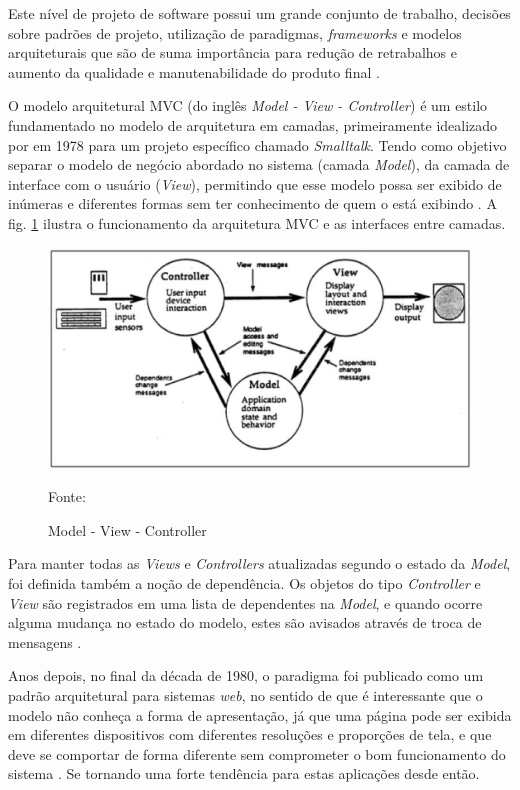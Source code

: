 Este nível de projeto de software possui um grande conjunto de trabalho, decisões sobre padrões de projeto, utilização de paradigmas, \textit{frameworks} e modelos arquiteturais que são de suma importância para redução de retrabalhos e aumento da qualidade e manutenabilidade do produto final \cite{krasner1988}.

O modelo arquitetural MVC (do inglês \textit{Model - View - Controller}) é um estilo fundamentado no modelo de arquitetura em camadas, primeiramente idealizado por \cite{reenskaug1979} em 1978 para um projeto específico chamado \textit{Smalltalk}. Tendo como objetivo separar o modelo de negócio abordado no sistema (camada \textit{Model}), da camada de interface com o usuário (\textit{View}), permitindo que esse modelo possa ser exibido de inúmeras e diferentes formas sem ter conhecimento de quem o está exibindo \cite{krasner1988}. A fig. \ref{fig:mvc} ilustra o funcionamento da arquitetura MVC e as interfaces entre camadas. 


\begin{figure}[h!]
	\centering
  	\includegraphics[width=.9\linewidth]{figuras/mvc.eps}
  	\caption{Model - View - Controller}
	\small{Fonte: \cite{krasner1988}}
  	\label{fig:mvc}
\end{figure} 

Para manter todas as \textit{Views} e \textit{Controllers} atualizadas segundo o estado da \textit{Model}, foi definida também a noção de dependência. Os objetos do tipo \textit{Controller} e \textit{View} são registrados em uma lista de dependentes na \textit{Model}, e quando ocorre alguma mudança no estado do modelo, estes são avisados através de troca de mensagens \cite{krasner1988}. 

Anos depois, no final da década de 1980, o paradigma foi publicado como um padrão arquitetural para sistemas \textit{web}, no sentido de que é interessante que o modelo não conheça a forma de apresentação, já que uma página pode ser exibida em diferentes dispositivos com diferentes resoluções e proporções de tela, e que deve se comportar de forma diferente sem comprometer o bom funcionamento do sistema \cite{krasner1988}. Se tornando uma forte tendência para estas aplicações desde então.

